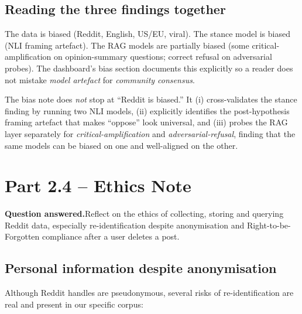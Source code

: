 \documentclass[11pt,a4paper]{article}
\newenvironment{extrabox}{%
  \par\medskip\noindent
  \def\FrameCommand{\fboxsep=6pt\fboxrule=0.6pt%
    \fcolorbox{extraboxrule}{extraboxbg}}%
  \MakeFramed{\advance\hsize-2\fboxsep\FrameRestore}%
  \noindent{\sffamily\bfseries\color{extraboxrule}Extra step.}\quad\ignorespaces%
}{\endMakeFramed\par\medskip}
\newcommand{\questionanswered}[1]{%
  \par\medskip\noindent\textbf{Question answered.}\quad #1\par\medskip%
}
\begin{document}
\subsection{Reading the three findings together}

The data is biased (Reddit, English, US/EU, viral). The stance model is biased (NLI framing
artefact). The RAG models are partially biased (some critical-amplification on opinion-summary
questions; correct refusal on adversarial probes). The dashboard's bias section documents this
explicitly so a reader does not mistake \emph{model artefact} for \emph{community consensus}.

\begin{extrabox}
The bias note does \emph{not} stop at ``Reddit is biased.'' It (i) cross-validates the stance
finding by running two NLI models, (ii) explicitly identifies the post-hypothesis framing
artefact that makes ``oppose'' look universal, and (iii) probes the RAG layer separately for
\emph{critical-amplification} and \emph{adversarial-refusal}, finding that the same models can be
biased on one and well-aligned on the other.
\end{extrabox}

\section{Part 2.4 -- Ethics Note}
\label{sec:ethics}

\questionanswered{Reflect on the ethics of collecting, storing and querying Reddit data,
especially re-identification despite anonymisation and Right-to-be-Forgotten compliance after
a user deletes a post.}

\subsection{Personal information despite anonymisation}

Although Reddit handles are pseudonymous, several risks of re-identification are real and
present in our specific corpus:
\end{document}
